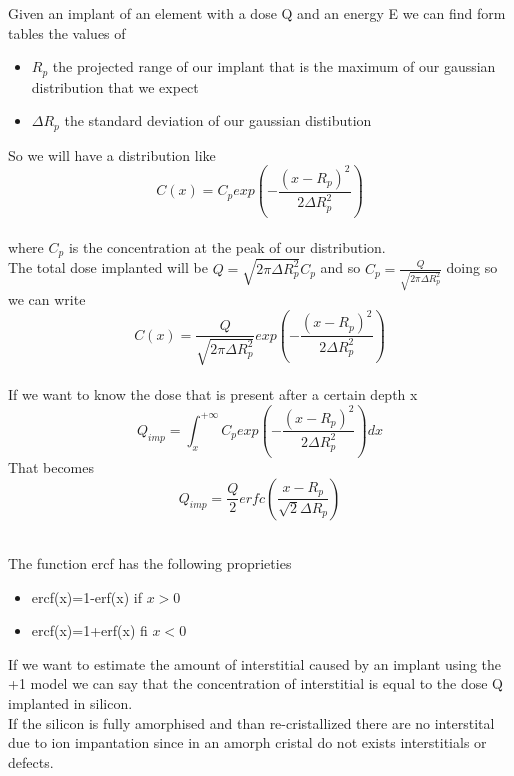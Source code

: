 Given an implant of an element with a dose Q and an energy E we can find form tables the values of 
    \begin{itemize}
    \item $R_p$ the projected range of our implant that is the maximum of our gaussian distribution that we expect
    \item $\Delta R_p$ the standard deviation of our gaussian distibution
    \end{itemize}
So we will have a distribution like 
\begin{equation}
C(x)=C_p exp\left(-\frac{(x-R_p)^2}{2\Delta R_p^2}\right)
\end{equation}
\\
where $C_p$ is the concentration at the peak of our distribution.\\
The total dose implanted will be $Q=\sqrt{2\pi\Delta R_p^2} C_p$ and so $C_p=\frac{Q}{\sqrt{2\pi\Delta R_p^2}}$ doing so we can write
\begin{equation}
C(x)=\frac{Q}{\sqrt{2\pi\Delta R_p^2}}exp\left(-\frac{(x-R_p)^2}{2\Delta R_p^2}\right)
\end{equation}
\\

If we want to know the dose that is present after a certain depth x
\begin{equation}
Q_{imp}=\int_x^{+\infty}C_p exp\left(-\frac{(x-R_p)^2}{2\Delta R_p^2}\right) dx
\end{equation}
That becomes 
\begin{equation}
Q_{imp}=\frac{Q}{2}erfc\left(\frac{x-R_p}{\sqrt{2}\Delta R_p}\right)
\end{equation}
\\
\vspace{5mm}

The function ercf has the following proprieties 
\begin{itemize}
\item ercf(x)=1-erf(x) if $x>0$
\item ercf(x)=1+erf(x) fi $x<0$
\end{itemize}

\vspace{6mm}

If we want to estimate the amount of interstitial caused by an implant using the +1 model we can say that the concentration of interstitial is equal to the dose Q implanted in silicon.\\
If the silicon is fully amorphised and than re-cristallized there are no interstital due to ion impantation since in an amorph cristal do not exists interstitials or defects.\\

